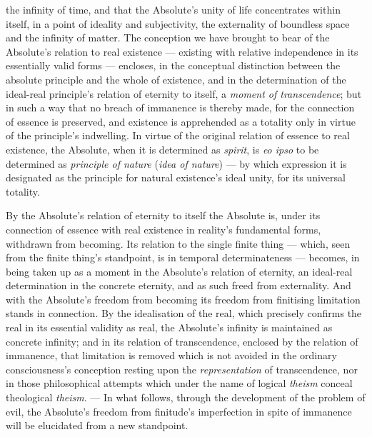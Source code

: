 \documentclass[12pt,a4paper]{book}
\begin{document}
the infinity of time, and that the Absolute's unity of life concentrates
within itself, in a point of ideality and subjectivity, the externality of
boundless space and the infinity of matter.
The conception we have brought to bear of the Absolute's relation to real
existence --- existing with relative independence in its essentially valid
forms --- encloses, in the conceptual distinction between the absolute
principle and the whole of existence, and in the determination of the
ideal-real principle's relation of eternity to itself, a \emph{moment of
transcendence}; but in such a way that no breach of immanence is thereby made,
for the connection of essence is preserved, and existence is apprehended as a
totality only in virtue of the principle's indwelling. In virtue of the
original relation of essence to real existence, the Absolute, when it is
determined as \emph{spirit}, is \textit{eo ipso} to be determined as
\emph{principle of nature} (\emph{idea of nature}) --- by which expression it
is designated as the principle for natural existence's ideal unity, for its
universal totality.

By the Absolute's relation of eternity to itself the Absolute is, under its
connection of essence with real existence in reality's fundamental forms,
withdrawn from becoming. Its relation to the single finite thing --- which,
seen from the finite thing's standpoint, is in temporal determinateness ---
becomes, in being taken up as a moment in the Absolute's relation of eternity,
an ideal-real determination in the concrete eternity, and as such freed from
externality. And with the Absolute's freedom from becoming its freedom from
finitising limitation stands in connection. By the idealisation of the real,
which precisely confirms the real in its essential validity as real, the
Absolute's infinity is maintained as concrete infinity; and in its relation of
transcendence, enclosed by the relation of immanence, that limitation is
removed which is not avoided in the ordinary consciousness's conception
resting upon the \emph{representation} of transcendence, nor in those
philosophical attempts which under the name of logical \emph{theism} conceal
theological \emph{theism}. --- In what follows, through the development of the
problem of evil, the Absolute's freedom from finitude's imperfection in spite
of immanence will be elucidated from a new standpoint.
\end{document}
